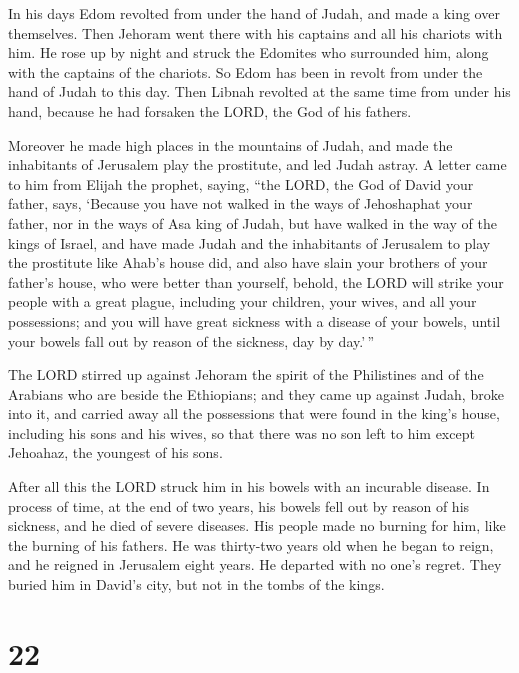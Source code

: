  In his days Edom revolted from under the hand of Judah, and
made a king over themselves.  Then Jehoram went there with
his captains and all his chariots with him. He rose up by night and
struck the Edomites who surrounded him, along with the captains of the
chariots.  So Edom has been in revolt from under the hand
of Judah to this day. Then Libnah revolted at the same time from under
his hand, because he had forsaken the LORD, the God of his fathers.

 Moreover he made high places in the mountains of Judah,
and made the inhabitants of Jerusalem play the prostitute, and led Judah
astray.  A letter came to him from Elijah the prophet,
saying, ``the LORD, the God of David your father, says, `Because you
have not walked in the ways of Jehoshaphat your father, nor in the ways
of Asa king of Judah,  but have walked in the way of the
kings of Israel, and have made Judah and the inhabitants of Jerusalem to
play the prostitute like Ahab's house did, and also have slain your
brothers of your father's house, who were better than yourself,
 behold, the LORD will strike your people with a great
plague, including your children, your wives, and all your possessions;
 and you will have great sickness with a disease of your
bowels, until your bowels fall out by reason of the sickness, day by
day.'\,''

 The LORD stirred up against Jehoram the spirit of the
Philistines and of the Arabians who are beside the Ethiopians;
 and they came up against Judah, broke into it, and carried
away all the possessions that were found in the king's house, including
his sons and his wives, so that there was no son left to him except
Jehoahaz, the youngest of his sons.

 After all this the LORD struck him in his bowels with an
incurable disease.  In process of time, at the end of two
years, his bowels fell out by reason of his sickness, and he died of
severe diseases. His people made no burning for him, like the burning of
his fathers.  He was thirty-two years old when he began to
reign, and he reigned in Jerusalem eight years. He departed with no
one's regret. They buried him in David's city, but not in the tombs of
the kings.

\hypertarget{section-21}{%
\section{22}\label{section-21}}

